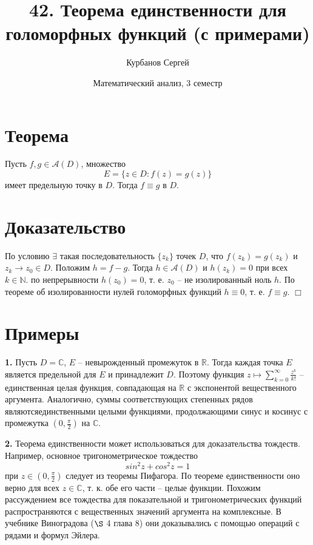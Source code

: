 \documentclass[16pt, letterpaper]{article}
\title{42. Теорема единственности для голоморфных функций (с примерами)}
\author{Курбанов Сергей}
\date{Математический анализ, 3 семестр}
\begin{document}
\maketitle

\section*{Теорема}
Пусть $f, g \in \mathcal{A}(D)$, множество $$E = \{z \in D : f(z) = g(z)\}$$ имеет предельную точку в $D$. Тогда $f \equiv g$ в $D$.

\vspace{5mm}

\section*{Доказательство} По условию $\exists$ такая последовательность $\{z_k\}$ точек $D$, что $f(z_k) = g(z_k)$ и $z_k \rightarrow z_0 \in D$. Положим $h = f - g$. Тогда $h \in \mathcal{A}(D)$ и $h(z_k) = 0$ при всех $k \in \mathbb{N}$. по непрерывности $h(z_0) = 0$, т. е. $z_0$ -- не изолированный ноль $h$. По теореме об изолированности нулей голоморфных функций $h \equiv 0$, т. е. $f \equiv g$. $\Box$

\vspace{5mm}

\section*{Примеры}
\textbf{1.} Пусть $D = \mathbb{C}$, $E$ -- невырожденный промежуток в $\mathbb{R}$. Тогда каждая точка $E$ является предельной для $E$ и принадлежит $D$. Поэтому функция $z \mapsto \displaystyle\sum_{k = 0}^\infty \frac{z^k}{k!}$ -- единственная целая функция, совпадающая на $\mathbb{R}$ с экспонентой вещественного аргумента. Аналогично, суммы соответствующих степенных рядов являютсяединственными целыми функциями, продолжающими синус и косинус с промежутка $(0, \frac{\pi}{2})$ на $\mathbb{C}$.

\vspace{5mm}

\textbf{2.} Теорема единственности может использоваться для доказательства тождеств. Например, основное тригонометрическое тождество $$sin^2 z + cos^2 z = 1$$ при $z \in (0, \frac{\pi}{2})$ следует из теоремы Пифагора. По теореме единственности оно верно для всех $z \in \mathbb{C}$, т. к. обе его части -- целые функции. Похожим рассуждением все тождества для показательной и тригонометрических функций распространяются с вещественных значений аргумента на комплексные. В учебнике Виноградова ($\S$ 4 глава 8) они доказывались с помощью операций с рядами и формул Эйлера.
\end{document}
